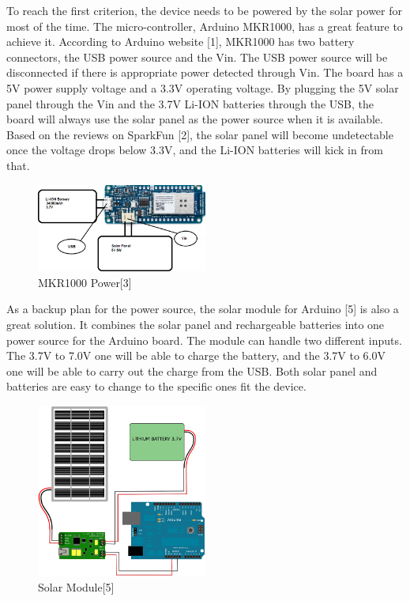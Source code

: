 \documentclass[IEEEtran,letterpaper,10pt,titlepage,fleqn,draftclsnofoot,onecolumn]{article}
\begin{document}
To reach the first criterion, the device needs to be powered by the solar power for most of the time. The micro-controller, Arduino MKR1000, has a great feature to achieve it. According to Arduino website [1], MKR1000 has two battery connectors, the USB power source and the Vin. The USB power source will be disconnected if there is appropriate power detected through Vin. The board has a 5V power supply voltage and a 3.3V operating voltage. By plugging the 5V solar panel through the Vin and the 3.7V Li-ION batteries through the USB, the board will always use the solar panel as the power source when it is available.  Based on the reviews on SparkFun [2], the solar panel will become undetectable once the voltage drops below 3.3V, and the Li-ION batteries will kick in from that.

\begin{figure}[H]
  \caption{MKR1000 Power[3]}
  \centering
    \includegraphics[width=0.5\textwidth]
  {power_graphic_1}
\end{figure}

As a backup plan for the power source, the solar module for Arduino [5] is also a great solution. It combines the solar panel and rechargeable batteries into one power source for the Arduino board. The module can handle two different inputs. The 3.7V to 7.0V one will be able to charge the battery, and the 3.7V to 6.0V one will be able to carry out the charge from the USB. Both solar panel and batteries are easy to change to the specific ones fit the device.

\begin{figure}[H]
  \caption{Solar Module[5]}
  \centering
    \includegraphics[width=0.5\textwidth]
  {power_graphic_2}
\end{figure}
\end{document}
